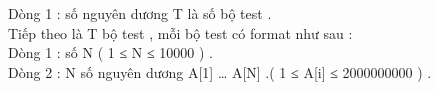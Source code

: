 Dòng 1 : số nguyên dương T là số bộ test .   
\\   Tiếp theo là T bộ test , mỗi bộ test có format như sau :   
\\   Dòng 1 : số N ( 1 ≤ N ≤ 10000 ) .   
\\   Dòng 2 : N số nguyên dương A[1] … A[N] .( 1 ≤ A[i] ≤ 2000000000 ) .   
\\

\